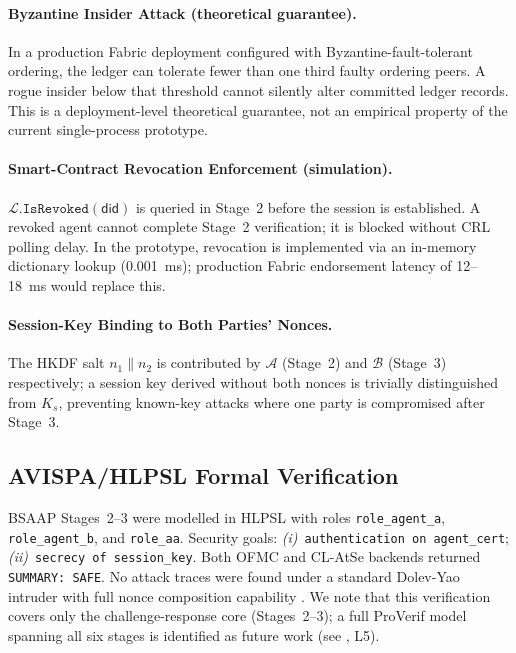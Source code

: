 \documentclass[review,5p,twocolumn,times]{elsarticle}
\begin{document}
\paragraph{Byzantine Insider Attack (theoretical guarantee).}
In a production Fabric deployment configured with Byzantine-fault-tolerant
ordering, the ledger can tolerate fewer than one third faulty ordering peers.
A rogue insider below that threshold cannot silently alter committed ledger
records. This is a deployment-level theoretical guarantee, not an empirical
property of the current single-process prototype.

\paragraph{Smart-Contract Revocation Enforcement (simulation).}
$\mathcal{L}.\mathtt{IsRevoked}(\mathsf{did})$ is queried in Stage~2
before the session is established. A revoked agent cannot complete
Stage~2 verification; it is blocked without CRL polling delay.
In the prototype, revocation is implemented via an in-memory dictionary
lookup (0.001~ms); production Fabric endorsement latency of 12--18~ms
\cite{androulaki2018hyperledger} would replace this.

\paragraph{Session-Key Binding to Both Parties' Nonces.}
The HKDF salt $n_1\|n_2$ is contributed by $\mathcal{A}$ (Stage~2) and
$\mathcal{B}$ (Stage~3) respectively; a session key derived without
both nonces is trivially distinguished from $K_s$, preventing
known-key attacks where one party is compromised after Stage~3.

\subsection{AVISPA/HLPSL Formal Verification}

BSAAP Stages~2--3 were modelled in HLPSL with roles
\texttt{role\_agent\_a}, \texttt{role\_agent\_b}, and \texttt{role\_aa}.
Security goals: \emph{(i)}~\texttt{authentication on agent\_cert};
\emph{(ii)}~\texttt{secrecy of session\_key}.
Both OFMC and CL-AtSe backends returned \texttt{SUMMARY:~SAFE}.
No attack traces were found under a standard Dolev-Yao intruder with
full nonce composition capability \cite{armando2005avispa}.
We note that this verification covers only the challenge-response core
(Stages~2--3); a full ProVerif model \cite{blanchet2016proverif} spanning
all six stages is identified as future work (see , L5).
\end{document}

